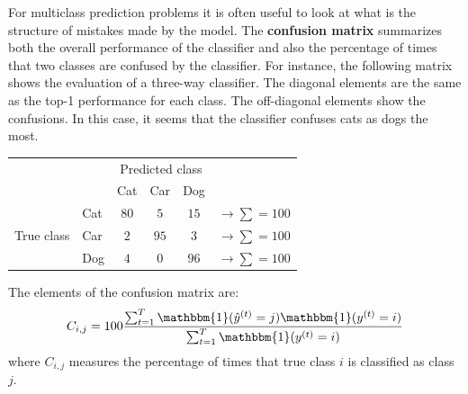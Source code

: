 For multiclass prediction problems it is often useful to look at what is the structure of mistakes made by the model. The {\bf confusion matrix} summarizes both the overall performance of the classifier and also the percentage of times that two classes are confused by the classifier. For instance, the following matrix shows the evaluation of a three-way classifier. The diagonal elements are the same as the top-1 performance for each class. The off-diagonal elements show the confusions. In this case, it seems that the classifier confuses cats as dogs the most.
\begin{table}[h]
    \faketablecaption{}
    \label{table:confusion_matrix}
    \begin{center}
        \begin{tabular}{l|l|c|c|c|c}
            \multicolumn{2}{c}{}  & \multicolumn{3}{c}{Predicted class} &                                                               \\
            \cline{3-5}
            \multicolumn{2}{c|}{} & Cat                                 & Car  & Dog  & \multicolumn{1}{c}{}                            \\
            \cline{2-5}
                                  & Cat                                 & $80$ & $5$  & $15$                 & $\rightarrow \sum = 100$ \\
            \cline{2-5}
            True class            & Car                                 & $2$  & $95$ & $3$                  & $\rightarrow \sum = 100$ \\
            \cline{2-5}
                                  & Dog                                 & $4$  & $0$  & $96$                 & $\rightarrow \sum = 100$ \\
            \cline{2-5}
        \end{tabular}
    \end{center}
\end{table}
The elements of the confusion matrix are:
\begin{equation}
    C_{i,j} = 100 \frac{
        \sum_{t=1}^T \mathbbm{1}( \hat{y}^{(t)} = j)  \mathbbm{1} (y^{(t)} = i)
    }{
        \sum_{t=1}^T \mathbbm{1}(y^{(t)} = i)
    }
\end{equation}
where $C_{i,j}$ measures the percentage of times that true class $i$ is classified as class $j$.

